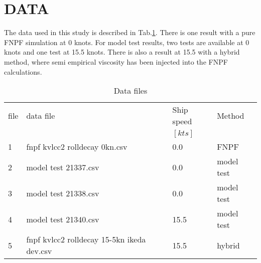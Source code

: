 \section*{DATA}\label{data}
The data used in this study is described in
Tab.\ref{tab:data_files}. There is one result with a pure FNPF
simulation at 0 knots. For model test results, two tests are available
at 0 knots and one test at 15.5 knots. There is also a result at 15.5
with a hybrid method, where semi empirical viscosity has been injected
into the FNPF calculations.
\begin{table}[H]
\scriptsize
\center
\caption{Data files}
\label{tab:data_files}
\begin{tabular}{|l|l|l|l|}
\hline\addlinespace
file & data file & Ship speed & Method\\
&  & $[kts]$ & \\
\hline1 & fnpf kvlcc2 rolldecay 0kn.csv & 0.0 & FNPF\\
2 & model test 21337.csv & 0.0 & model test\\
3 & model test 21338.csv & 0.0 & model test\\
4 & model test 21340.csv & 15.5 & model test\\
5 & fnpf kvlcc2 rolldecay 15-5kn ikeda dev.csv & 15.5 & hybrid\\
\hline
\end{tabular}
\end{table}
